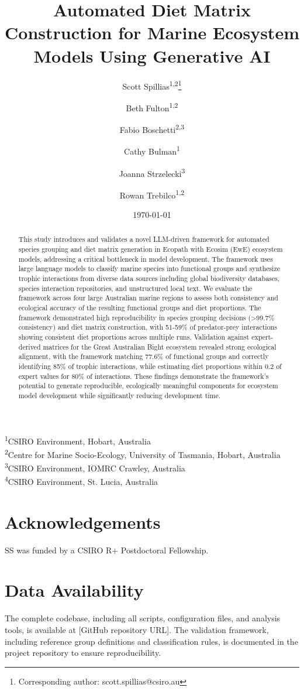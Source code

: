 \documentclass[12pt,a4paper]{article}
\title{Automated Diet Matrix Construction for Marine Ecosystem Models Using Generative AI}
\author{Scott Spillias\textsuperscript{1,2}\thanks{Corresponding author: scott.spillias@csiro.au} \and
Beth Fulton\textsuperscript{1,2} \and
Fabio Boschetti\textsuperscript{2,3} \and
Cathy Bulman\textsuperscript{1} \and
Joanna Strzelecki\textsuperscript{3} \and
Rowan Trebilco\textsuperscript{1,2}}
\date{\today}  %
\newcommand{\affiliations}{
\noindent\textsuperscript{1}CSIRO Environment, Hobart, Australia\\
\textsuperscript{2}Centre for Marine Socio-Ecology, University of Tasmania, Hobart, Australia\\
\textsuperscript{3}CSIRO Environment, IOMRC Crawley, Australia\\
\textsuperscript{4}CSIRO Environment, St. Lucia, Australia
}
\begin{document}
\maketitle
\affiliations

\begin{abstract}
This study introduces and validates a novel LLM-driven framework for automated species grouping and diet matrix generation in Ecopath with Ecosim (EwE) ecosystem models, addressing a critical bottleneck in model development. The framework uses large language models to classify marine species into functional groups and synthesize trophic interactions from diverse data sources including global biodiversity databases, species interaction repositories, and unstructured local text. We evaluate the framework across four large Australian marine regions to assess both consistency and ecological accuracy of the resulting functional groups and diet proportions. The framework demonstrated high reproducibility in species grouping decisions (>99.7\% consistency) and diet matrix construction, with 51-59\% of predator-prey interactions showing consistent diet proportions across multiple runs. Validation against expert-derived matrices for the Great Australian Bight ecosystem revealed strong ecological alignment, with the framework matching 77.6\% of functional groups and correctly identifying 85\% of trophic interactions, while estimating diet proportions within 0.2 of expert values for 80\% of interactions. These findings demonstrate the framework's potential to generate reproducible, ecologically meaningful components for ecosystem model development while significantly reducing development time.
\end{abstract}






\section*{Acknowledgements}
SS was funded by a CSIRO R+ Postdoctoral Fellowship.

\section*{Data Availability}
The complete codebase, including all scripts, configuration files, and analysis tools, is available at [GitHub repository URL]. The validation framework, including reference group definitions and classification rules, is documented in the project repository to ensure reproducibility.
\end{document}
